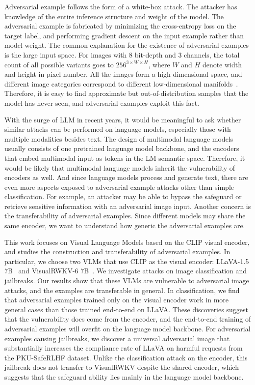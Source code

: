\documentclass{article}
\begin{document}
Adversarial example follows the form of a white-box attack.
The attacker has knowledge of the entire inference structure and weight of the model. The adversarial example is fabricated by minimizing the cross-entropy loss on the target label, and performing gradient descent on the input example rather than model weight.
The common explanation for the existence of adversarial examples is the large input space.
For images with 8 bit-depth and 3 channels, the total count of all possible variants goes to $256^{3\times W \times H}$, where $W$ and $H$ denote width and height in pixel number.
All the images form a high-dimensional space, and different image categories correspond to different low-dimensional manifolds~\cite{Fefferman2016Manifold}.
Therefore, it is easy to find approximate but out-of-distribution samples that the model has never seen, and adversarial examples exploit this fact.


With the surge of LLM in recent years, it would be meaningful to ask whether similar attacks can be performed on language models, especially those with multiple modalities besides text.
The design of multimodal language models usually consists of one pretrained language model backbone, and the encoders that embed multimodal input as tokens in the LM semantic space. Therefore, it would be likely that multimodal language models inherit the vulnerability of encoders as well. And since language models process and generate text, there are even more aspects exposed to adversarial example attacks other than simple classification. 
For example, an attacker may be able to bypass the safeguard or retrieve sensitive information with an adversarial image input.
Another concern is the transferability of adversarial examples.
Since different models may share the same encoder, we want to understand how generic the adversarial examples are.

This work focuses on Visual Language Models based on the CLIP visual encoder, and studies the construction and transferability of adversarial examples. 
In particular, we choose two VLMs that use CLIP as the visual encoder: LLaVA-1.5 7B~\cite{Liu2024LLaVA15} and VisualRWKV-6 7B~\cite{Hou2025VisualRWKV}.
We investigate attacks on image classification and jailbreaks.
Our results show that these VLMs are vulnerable to adversarial image attacks, and the examples are transferable in general. 
In classification, we find that adversarial examples trained only on the visual encoder work in more general cases than those trained end-to-end on LLaVA. 
These discoveries suggest that the vulnerability does come from the encoder, and the end-to-end training of adversarial examples will overfit on the language model backbone.
For adversarial examples causing jailbreaks, we discover a universal adversarial image that substantially increases the compliance rate of LLaVA on harmful requests from the PKU-SafeRLHF dataset. Unlike the classification attack on the encoder, this jailbreak does not transfer to VisualRWKV despite the shared encoder, which suggests that the safeguard ability lies mainly in the language model backbone.
\end{document}
